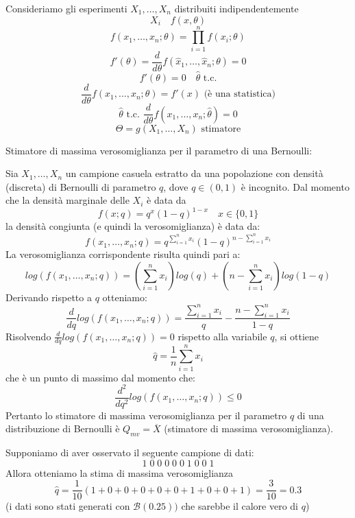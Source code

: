 \documentclass[a4paper]{article}
\theoremstyle{break}
\theoremstyle{break}
\theoremstyle{break}
\theoremstyle{break}
\begin{document}
\begin{example}
  Consideriamo gli esperimenti \( X_1, \ldots, X_n \) distribuiti indipendentemente
  \[
  X_i \quad f(x,\theta)
  \] 
  \[
  f(x_1, \ldots, x_n; \theta) = \prod_{i=1}^n f(x_i; \theta)
  \] 
  \[
    f'(\theta) = \frac{d}{d\theta} f(\hat{x}_1, \ldots, \hat{x}_n; \theta) = 0
  \] 
  \[
    f'(\theta) = 0 \quad \hat{\theta} \text{ t.c.}
  \] 
  \[
    \frac{d}{d\theta} f(x_1, \ldots, x_n; \theta) = f'(x) \text{ (è una statistica)}
  \] 
  \[
    \hat{\theta} \text{ t.c. } \frac{d}{d \theta} f(x_1, \ldots, x_n; \hat{\theta}) = 0
  \] 
  \[
    \Theta = g(X_1, \ldots, X_n) \text{ stimatore}
  \] 
\end{example}

\begin{exercise}
  Stimatore di massima verosomiglianza per il parametro di una Bernoulli:

  \vspace{1em}
  \noindent Sia \( X_1, \ldots, X_n \) un campione casuela estratto da una popolazione
  con densità (discreta) di Bernoulli di parametro \( q \), dove \( q \in (0,1) \) è
  incognito. Dal momento che la densità marginale delle \( X_i \) è data da
  \[
  f(x;q) = q^x(1-q)^{1-x} \quad x \in \{0,1\}
  \] 
  la densità congiunta (e quindi la verosomiglianza) è data da:
  \[
  f(x_1, \ldots, x_n; q) = q^{\sum_{i=1}^n x_i}(1-q)^{n - \sum_{i=1}^n x_i}
  \] 
  La verosomiglianza corrispondente risulta quindi pari a:
  \[
  log(f(x_1, \ldots, x_n; q)) = \left( \sum_{i=1}^n x_i \right) log(q) + \left( n - \sum_{i=1}^n x_i \right) log(1-q)
  \] 
  Derivando rispetto a \( q \) otteniamo:
  \[
  \frac{d}{dq} log(f(x_1, \ldots, x_n; q)) = \frac{\sum_{i=1}^n x_i}{q} - \frac{n - \sum_{i=1}^n x_i}{1-q}
  \] 
  Risolvendo \( \frac{d}{dq} log(f(x_1, \ldots, x_n; q)) = 0 \) rispetto alla variabile \( q \),
  si ottiene \[ \hat{q} = \frac{1}{n} \sum_{i=1}^n x_i \] che è un punto di massimo
  dal momento che:
  \[
  \frac{d^2}{dq^2} log(f(x_1, \ldots, x_n; q)) \le 0
  \] 
  Pertanto lo stimatore di massima verosomiglianza per il parametro \( q \) di una
  distribuzione di Bernoulli è \( Q_{mv} = \overline{X} \) (stimatore di massima verosomiglianza).

  \vspace{1em}
  Supponiamo di aver osservato il seguente campione di dati:
  \[
  1\;0\;0\;0\;0\;0\;1\;0\;0\;1
  \] 
  Allora otteniamo la stima di massima verosomiglianza
  \[
    \hat{q} = \frac{1}{10}(1+0+0+0+0+0+1+0+0+1) = \frac{3}{10} = 0.3
  \] 
  (i dati sono stati generati con \(\mathcal{B}(0.25))\) che sarebbe il calore vero di \( q \))
\end{exercise}
\end{document}
